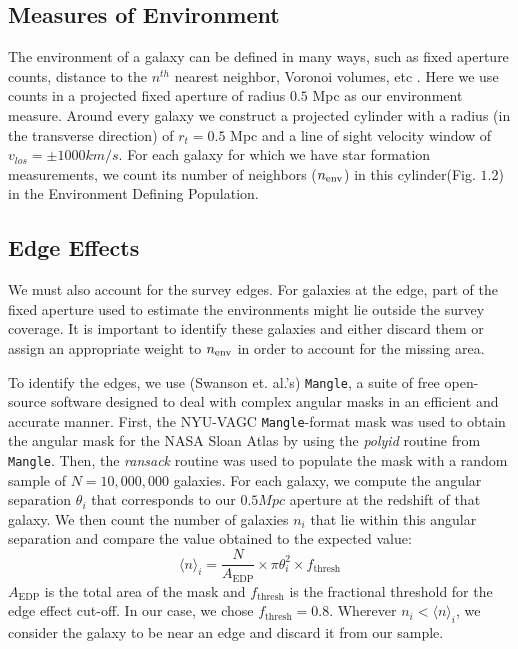 \subsection{Measures of Environment}

The environment of a galaxy can be defined in many ways, such as 
fixed aperture counts, distance to the $n^{th}$ nearest neighbor, 
Voronoi volumes, etc \citep{cooper_measuring_2005}. Here we use counts 
in a projected fixed aperture of radius $0.5$ Mpc as our environment 
measure. Around every galaxy we construct a projected cylinder with a 
radius (in the transverse direction) of $r_{t} = 0.5$ Mpc and a line 
of sight velocity window of $v_{los} = \pm 1000 km/s$. For each
galaxy for which we have star formation measurements, we count its 
number of neighbors ($n_{\rm env}$) in this cylinder(Fig. $1.2$) in
the Environment Defining Population.\\

\subsection{Edge Effects}\label{edge}

We must also account for the survey edges. For galaxies at the edge, 
part of the fixed aperture used to estimate the environments might 
lie outside the survey coverage. It is important to identify these 
galaxies and either discard them or assign an appropriate weight to 
$n_{\rm env}$ in order to account for the missing area. 

To identify the edges, we use (Swanson et. al.'s) \texttt{Mangle}, 
a suite of free open-source software designed to deal with complex 
angular masks in an efficient and accurate manner. First, the 
NYU-VAGC \texttt{Mangle}-format mask was used to obtain the angular 
mask for the NASA  Sloan Atlas by using the \emph{polyid} routine 
from \texttt{Mangle}. Then, the \emph{ransack} routine was used to 
populate the mask with a random sample of $N = 10,000,000$ galaxies. 
For each galaxy, we compute the angular separation $\theta_{i}$ 
that corresponds to our $0.5 Mpc$ aperture at the redshift 
of that galaxy. We then count the number of galaxies $n_{i}$ that 
lie within this angular separation and compare the value obtained 
to the expected value: 
$$\big \langle n \big \rangle _{i} = \frac{N}{A_{\mathrm{EDP}}} \times \pi \theta_{i}^{2} \times f_{\mathrm{thresh}} $$
$A_{\mathrm{EDP}}$ is the total area of the mask and $f_{\mathrm{thresh}}$ is the fractional threshold for the edge effect cut-off. In our case, we chose $f_{\mathrm{thresh}} = 0.8$. Wherever $n_{i} < \big \langle n \big \rangle _{i} $, we consider the galaxy to be near an edge and discard it from our sample. \\

